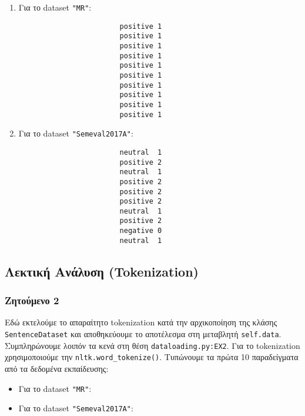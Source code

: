 \documentclass[a4paper, 12pt]{article}
\begin{document}
            \begin{enumerate}
                \item Για το dataset \verb|"MR"|:
                    \begin{verbatim}
                        positive 1
                        positive 1
                        positive 1
                        positive 1
                        positive 1
                        positive 1
                        positive 1
                        positive 1
                        positive 1
                        positive 1
                    \end{verbatim}
                
                \item Για το dataset \verb|"Semeval2017A"|:
                    \begin{verbatim}
                        neutral  1
                        positive 2
                        neutral  1
                        positive 2
                        positive 2
                        positive 2
                        neutral  1
                        positive 2
                        negative 0
                        neutral  1
                    \end{verbatim}
            \end{enumerate}

    \subsection{Λεκτική Ανάλυση (Tokenization)}
    
        \subsubsection*{Ζητούμενο 2}
            Εδώ εκτελούμε το απαραίτητο tokenization κατά την αρχικοποίηση της κλάσης \verb|SentenceDataset| και αποθηκεύουμε το αποτέλεσμα στη μεταβλητή \verb|self.data|. Συμπληρώνουμε λοιπόν τα κενά στη θέση \verb|dataloading.py:EX2|. Για το tokenization χρησιμοποιούμε την \verb|nltk.word_tokenize()|. Τυπώνουμε τα πρώτα 10 παραδείγματα από τα δεδομένα εκπαίδευσης:
            
            \begin{itemize}
                \item Για το dataset \verb|"MR"|:
                    
                
                \item Για το dataset \verb|"Semeval2017A"|:
                    
            \end{itemize}
\end{document}
